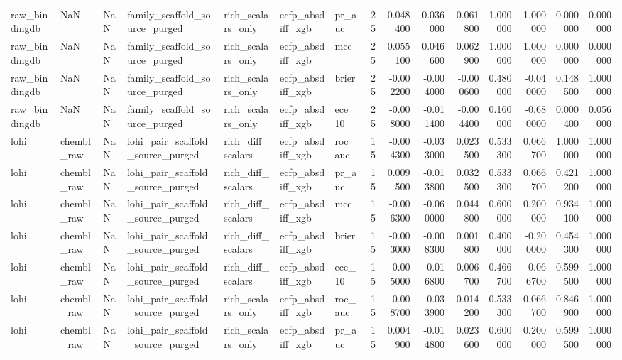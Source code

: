 \begin{longtable}{lllllllrrrrrrrr}
raw\_bindingdb & NaN & NaN & family\_scaffold\_source\_purged & rich\_scalars\_only & ecfp\_absdiff\_xgb & pr\_auc & 25 & 0.048400 & 0.036000 & 0.061800 & 1.000000 & 1.000000 & 0.000000 & 0.000000 \\
raw\_bindingdb & NaN & NaN & family\_scaffold\_source\_purged & rich\_scalars\_only & ecfp\_absdiff\_xgb & mcc & 25 & 0.055100 & 0.046600 & 0.062900 & 1.000000 & 1.000000 & 0.000000 & 0.000000 \\
raw\_bindingdb & NaN & NaN & family\_scaffold\_source\_purged & rich\_scalars\_only & ecfp\_absdiff\_xgb & brier & 25 & -0.002200 & -0.004000 & -0.000600 & 0.480000 & -0.040000 & 0.148500 & 1.000000 \\
raw\_bindingdb & NaN & NaN & family\_scaffold\_source\_purged & rich\_scalars\_only & ecfp\_absdiff\_xgb & ece\_10 & 25 & -0.008000 & -0.011400 & -0.004400 & 0.160000 & -0.680000 & 0.000400 & 0.056000 \\
lohi & chembl\_raw & NaN & lohi\_pair\_scaffold\_source\_purged & rich\_diff\_scalars & ecfp\_absdiff\_xgb & roc\_auc & 15 & -0.004300 & -0.033000 & 0.023500 & 0.533300 & 0.066700 & 1.000000 & 1.000000 \\
lohi & chembl\_raw & NaN & lohi\_pair\_scaffold\_source\_purged & rich\_diff\_scalars & ecfp\_absdiff\_xgb & pr\_auc & 15 & 0.009500 & -0.013800 & 0.032500 & 0.533300 & 0.066700 & 0.421200 & 1.000000 \\
lohi & chembl\_raw & NaN & lohi\_pair\_scaffold\_source\_purged & rich\_diff\_scalars & ecfp\_absdiff\_xgb & mcc & 15 & -0.006300 & -0.060000 & 0.044800 & 0.600000 & 0.200000 & 0.934100 & 1.000000 \\
lohi & chembl\_raw & NaN & lohi\_pair\_scaffold\_source\_purged & rich\_diff\_scalars & ecfp\_absdiff\_xgb & brier & 15 & -0.003000 & -0.008300 & 0.001800 & 0.400000 & -0.200000 & 0.454300 & 1.000000 \\
lohi & chembl\_raw & NaN & lohi\_pair\_scaffold\_source\_purged & rich\_diff\_scalars & ecfp\_absdiff\_xgb & ece\_10 & 15 & -0.005000 & -0.016800 & 0.006700 & 0.466700 & -0.066700 & 0.599500 & 1.000000 \\
lohi & chembl\_raw & NaN & lohi\_pair\_scaffold\_source\_purged & rich\_scalars\_only & ecfp\_absdiff\_xgb & roc\_auc & 15 & -0.008700 & -0.033900 & 0.014200 & 0.533300 & 0.066700 & 0.846900 & 1.000000 \\
lohi & chembl\_raw & NaN & lohi\_pair\_scaffold\_source\_purged & rich\_scalars\_only & ecfp\_absdiff\_xgb & pr\_auc & 15 & 0.004900 & -0.014800 & 0.023600 & 0.600000 & 0.200000 & 0.599500 & 1.000000 \\

\end{longtable}
